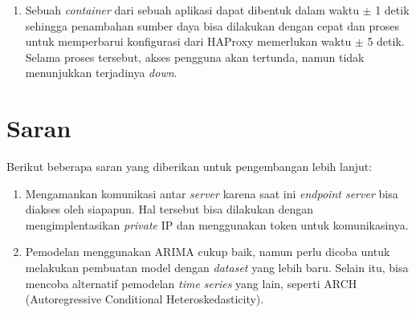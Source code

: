 \begin{enumerate}
            \item Sebuah \textit{container} dari sebuah aplikasi dapat dibentuk dalam waktu $\pm$ 1 detik sehingga penambahan sumber daya bisa dilakukan dengan cepat dan proses untuk memperbarui konfigurasi dari HAProxy memerlukan waktu $\pm$ 5 detik. Selama proses tersebut, akses pengguna akan tertunda, namun tidak menunjukkan terjadinya \textit{down}.
		\end{enumerate}
        
	\section{Saran}
		Berikut beberapa saran yang diberikan untuk pengembangan lebih lanjut:
		\begin{enumerate}
			\item Mengamankan komunikasi antar \textit{server} karena saat ini \textit{endpoint server} bisa diakses oleh siapapun. Hal tersebut bisa dilakukan dengan mengimplentasikan \textit{private} IP dan menggunakan token untuk komunikasinya.
            \item Pemodelan menggunakan ARIMA cukup baik, namun perlu dicoba untuk melakukan pembuatan model dengan \textit{dataset} yang lebih baru. Selain itu, bisa mencoba alternatif pemodelan \textit{time series} yang lain, seperti ARCH (Autoregressive Conditional Heteroskedasticity).
		\end{enumerate}